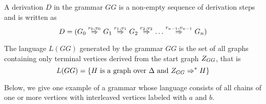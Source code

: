 \documentclass[runningheads]{llncs}
\begin{document}
\begin{definition}
	A derivation $D$ in the grammar $GG$ is a non-empty sequence of derivation steps and is written as
	\begin{equation*}
		D = (G_0 \deriv{r_0}{v_0}{} G_1 \deriv{r_1}{v_1}{} G_2 \deriv{r_2}{v_2}{} \dots \deriv{r_{n-1}}{v_{n-1}}{} G_n)
	\end{equation*}
\end{definition}

\begin{definition}
	\label{def:language}
	The language $L(GG)$ generated by the grammar $GG$ is the set of all graphs containing only terminal vertices derived from the start graph $Z_{GG}$, that is
	\begin{equation*}
		L(GG) = \{H \text{ is a graph over } \Delta \text{ and } Z_{GG} \Rightarrow^*_{} H\}
	\end{equation*}
\end{definition}

Below, we give one example of a grammar whose language consists of all chains of one or more vertices with interleaved vertices labeled with $a$ and $b$.
\end{document}
